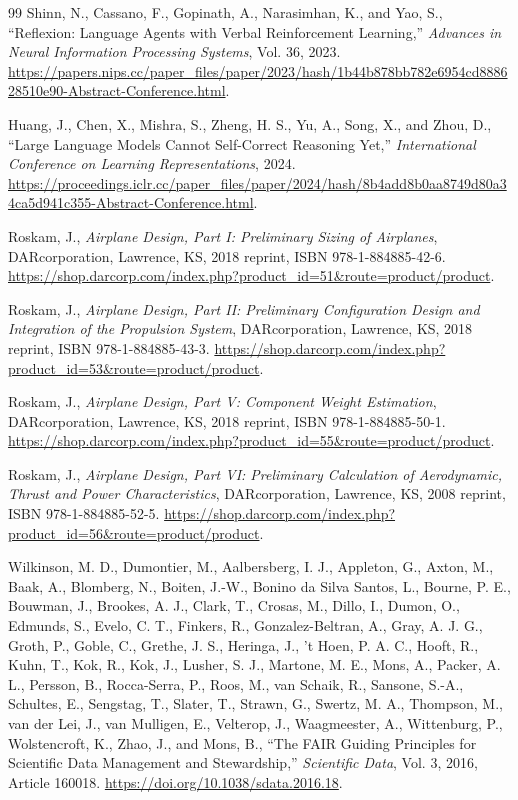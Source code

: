 \documentclass[11pt,a4paper]{article}
\begin{document}
\begin{thebibliography}{99}
 Shinn, N., Cassano, F., Gopinath, A., Narasimhan, K., and Yao, S., ``Reflexion: Language Agents with Verbal Reinforcement Learning,'' \emph{Advances in Neural Information Processing Systems}, Vol. 36, 2023. \url{https://papers.nips.cc/paper_files/paper/2023/hash/1b44b878bb782e6954cd888628510e90-Abstract-Conference.html}.

 Huang, J., Chen, X., Mishra, S., Zheng, H. S., Yu, A., Song, X., and Zhou, D., ``Large Language Models Cannot Self-Correct Reasoning Yet,'' \emph{International Conference on Learning Representations}, 2024. \url{https://proceedings.iclr.cc/paper_files/paper/2024/hash/8b4add8b0aa8749d80a34ca5d941c355-Abstract-Conference.html}.

 Roskam, J., \emph{Airplane Design, Part I: Preliminary Sizing of Airplanes}, DARcorporation, Lawrence, KS, 2018 reprint, ISBN 978-1-884885-42-6. \url{https://shop.darcorp.com/index.php?product_id=51&route=product/product}.

 Roskam, J., \emph{Airplane Design, Part II: Preliminary Configuration Design and Integration of the Propulsion System}, DARcorporation, Lawrence, KS, 2018 reprint, ISBN 978-1-884885-43-3. \url{https://shop.darcorp.com/index.php?product_id=53&route=product/product}.

 Roskam, J., \emph{Airplane Design, Part V: Component Weight Estimation}, DARcorporation, Lawrence, KS, 2018 reprint, ISBN 978-1-884885-50-1. \url{https://shop.darcorp.com/index.php?product_id=55&route=product/product}.

 Roskam, J., \emph{Airplane Design, Part VI: Preliminary Calculation of Aerodynamic, Thrust and Power Characteristics}, DARcorporation, Lawrence, KS, 2008 reprint, ISBN 978-1-884885-52-5. \url{https://shop.darcorp.com/index.php?product_id=56&route=product/product}.

 Wilkinson, M. D., Dumontier, M., Aalbersberg, I. J., Appleton, G., Axton, M., Baak, A., Blomberg, N., Boiten, J.-W., Bonino da Silva Santos, L., Bourne, P. E., Bouwman, J., Brookes, A. J., Clark, T., Crosas, M., Dillo, I., Dumon, O., Edmunds, S., Evelo, C. T., Finkers, R., Gonzalez-Beltran, A., Gray, A. J. G., Groth, P., Goble, C., Grethe, J. S., Heringa, J., 't Hoen, P. A. C., Hooft, R., Kuhn, T., Kok, R., Kok, J., Lusher, S. J., Martone, M. E., Mons, A., Packer, A. L., Persson, B., Rocca-Serra, P., Roos, M., van Schaik, R., Sansone, S.-A., Schultes, E., Sengstag, T., Slater, T., Strawn, G., Swertz, M. A., Thompson, M., van der Lei, J., van Mulligen, E., Velterop, J., Waagmeester, A., Wittenburg, P., Wolstencroft, K., Zhao, J., and Mons, B., ``The FAIR Guiding Principles for Scientific Data Management and Stewardship,'' \emph{Scientific Data}, Vol. 3, 2016, Article 160018. \url{https://doi.org/10.1038/sdata.2016.18}.


\end{thebibliography}
\end{document}

